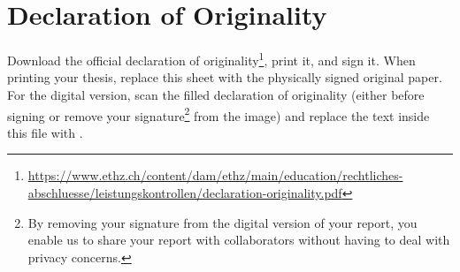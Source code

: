 \chapter*{Declaration of Originality}

Download the official declaration of originality\footnote{\url{https://www.ethz.ch/content/dam/ethz/main/education/rechtliches-abschluesse/leistungskontrollen/declaration-originality.pdf}}, print it, and sign it.
When printing your thesis, replace this sheet with the physically signed original paper.
For the digital version, scan the filled declaration of originality (either before signing or remove your signature\footnote{%
  By removing your signature from the digital version of your report, you enable us to share your report with collaborators without having to deal with privacy concerns.
} from the image) and replace the text inside this file with \verb||.
